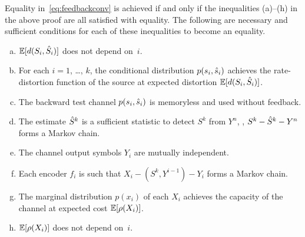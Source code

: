 Equality in~\eqref{eq:feedbackconv} is achieved if and only if the inequalities
(a)--(h) in the above proof are all satisfied with equality. The following are
necessary and sufficient conditions for each of these inequalities to become an
equality.
\begin{enumerate}[(a)]
  \item $\mathbb{E}[d(S_i, {\hat{S}}_i)]$ does not depend on~$i$. %
  \item For each $i = 1$, \ldots, $k$, the conditional distribution $p(s_i,
    {\hat{s}}_i)$ achieves the rate-distortion function of the source at expected
    distortion $\mathbb{E}[d(S_i, {\hat{S}}_i)]$. 
  \item The backward test channel $p(s_i, {\hat{s}}_i)$ is memoryless and used without
    feedback.
  \item The estimate ${\hat{S}}^k$ is a sufficient statistic to detect $S^k$ from
    $Y^n$, \ie, $S^k - {\hat{S}}^k - Y^n$ forms a Markov chain. 
  \item The channel output symbols $Y_i$ are mutually independent. 
  \item Each encoder $f_i$ is such that $X_i - (S^k, Y^{i-1}) - Y_i$ forms a
    Markov chain. 
  \item The marginal distribution $p(x_i)$ of each $X_i$ achieves the capacity
    of the channel at expected cost $\mathbb{E}[\rho(X_i)]$. 
  \item $\mathbb{E}[\rho(X_i)]$ does not depend on~$i$.
\end{enumerate}

%
%
%  
%

